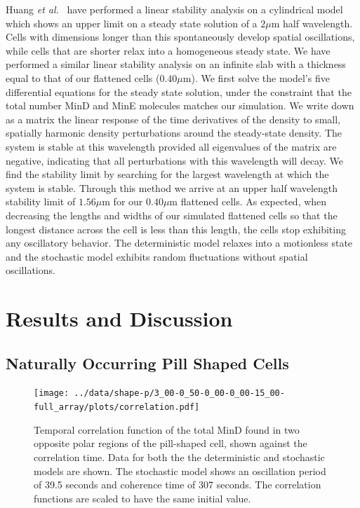 \documentclass[10pt,letterpaper]{article}
\newcommand\micron{\ensuremath{\mu\text{m}}}
\begin{document}
Huang \emph{et al.}~\cite{huang2003dynamic} have performed a linear
stability analysis on a cylindrical model which shows an upper limit
on a steady state solution of a $2\micron$ half wavelength.  Cells
with dimensions longer than this spontaneously develop spatial
oscillations, while cells that are shorter relax into a homogeneous
steady state.  We have performed a similar linear stability analysis
on an infinite slab with a thickness equal to that of our flattened
cells ($0.40\micron$).  We first solve the model's five differential
equations for the steady state solution, under the constraint that the
total number MinD and MinE molecules matches our simulation.  We write
down as a matrix the linear response of the time derivatives of the
density to small, spatially harmonic density perturbations around the
steady-state density.  The system is stable at this wavelength
provided all eigenvalues of the matrix are negative, indicating that
all perturbations with this wavelength will decay.  We find the
stability limit by searching for the largest wavelength at which the
system is stable.  Through this method we arrive at an upper half
wavelength stability limit of $1.56\micron$ for our $0.40\micron$
flattened cells. As expected, when decreasing the lengths and widths
of our simulated flattened cells so that the longest distance across
the cell is less than this length, the cells stop exhibiting any
oscillatory behavior.  The deterministic model relaxes into a
motionless state and the stochastic model exhibits random fluctuations
without spatial oscillations.

\section*{Results and Discussion}
\subsection*{Naturally Occurring Pill Shaped Cells}


\begin{figure}
  \begin{center}
    \texttt{[image: ../data/shape-p/3\_00-0\_50-0\_00-0\_00-15\_00-full\_array/plots/correlation.pdf]}
  \end{center}
  \caption{Temporal correlation function of the total MinD found in
    two opposite polar regions of the pill-shaped cell, shown against
    the correlation time.  Data for both the the deterministic and
    stochastic models are shown.  The stochastic model shows an
    oscillation period of 39.5 seconds and coherence time of 307 seconds.
    The correlation functions are scaled to have the same initial
    value.}
  \label{corr-pill}
\end{figure}
\end{document}

